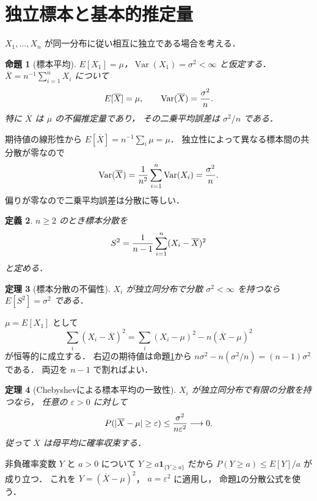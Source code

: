 \documentclass[a5paper,10pt,onecolumn]{jsarticle}
\makeatletter
\theoremstyle{mathnotetheorem}
\newtheorem{theorem}{定理}[section]
\newtheorem{definition}[theorem]{定義}
\newtheorem{proposition}[theorem]{命題}
\renewcommand{\proofname}{証明}
\renewenvironment{proof}[1][\proofname]{%
  \par\pushQED{\qed}\normalfont\topsep4\p@\@plus2\p@\relax
  \trivlist\item[\hskip\labelsep\bfseries #1]\ignorespaces
}{\popQED\endtrivlist\@endpefalse}
\makeatother
\begin{document}
\section{独立標本と基本的推定量}
$X_1,\dots,X_n$ が同一分布に従い相互に独立である場合を考える．
\begin{proposition}[標本平均]\label{prop:mean}
$E[X_1]=\mu$，$\operatorname{Var}(X_1)=\sigma^2<\infty$
と仮定する．
$\overline X=n^{-1}\sum_{i=1}^nX_i$ について
\[
 E[\overline X]=\mu,\qquad
 \operatorname{Var}(\overline X)={\sigma^2\over n}.
\]
特に $\overline X$ は $\mu$ の不偏推定量であり，
その二乗平均誤差は $\sigma^2/n$ である．
\end{proposition}
\begin{proof}
期待値の線形性から
$E[\overline X]=n^{-1}\sum_i\mu=\mu$．
独立性によって異なる標本間の共分散が零なので
\[
 \operatorname{Var}(\overline X)
 ={1\over n^2}\sum_{i=1}^n\operatorname{Var}(X_i)
 ={\sigma^2\over n}.
\]
偏りが零なので二乗平均誤差は分散に等しい．
\end{proof}
\begin{definition}
$n\ge2$ のとき標本分散を
\[
 S^2={1\over n-1}\sum_{i=1}^n(X_i-\overline X)^2
\]
と定める．
\end{definition}
\begin{theorem}[標本分散の不偏性]\label{thm:samplevariance}
$X_i$ が独立同分布で分散 $\sigma^2<\infty$ を持つなら
$E[S^2]=\sigma^2$ である．
\end{theorem}
\begin{proof}
$\mu=E[X_1]$ として
\[
 \sum_i(X_i-\overline X)^2
 =\sum_i(X_i-\mu)^2-n(\overline X-\mu)^2
\]
が恒等的に成立する．
右辺の期待値は命題\ref{prop:mean}から
$n\sigma^2-n(\sigma^2/n)=(n-1)\sigma^2$ である．
両辺を $n-1$ で割ればよい．
\end{proof}
\begin{theorem}[Chebyshevによる標本平均の一致性]
$X_i$ が独立同分布で有限の分散を持つなら，
任意の $\varepsilon>0$ に対して
\[
 P(|\overline X-\mu|\ge\varepsilon)
 \le{\sigma^2\over n\varepsilon^2}\longrightarrow0.
\]
従って $\overline X$ は母平均に確率収束する．
\end{theorem}
\begin{proof}
非負確率変数 $Y$ と $a>0$ について
$Y\ge a\mathbf1_{\{Y\ge a\}}$ だから
$P(Y\ge a)\le E[Y]/a$ が成り立つ．
これを $Y=(\overline X-\mu)^2$，
$a=\varepsilon^2$ に適用し，
命題\ref{prop:mean}の分散公式を使う．
\end{proof}
\end{document}
